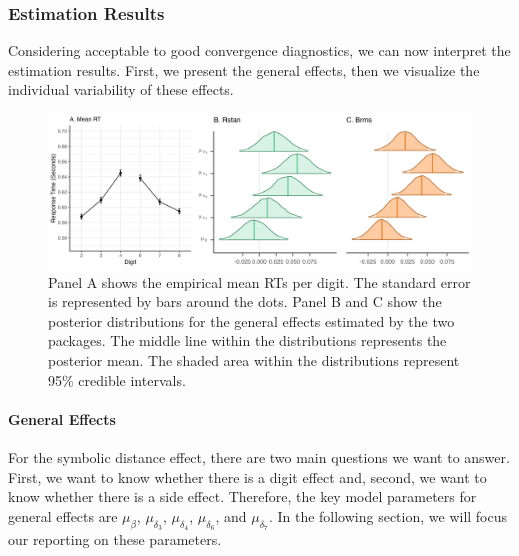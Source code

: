 \documentclass[
  english,
  doc,floatsintext]{apa6}
\let\oldparagraph\paragraph
\renewcommand{\paragraph}[1]{\oldparagraph{#1}\mbox{}}
\begin{document}
\hypertarget{estimation-results}{%
\subsubsection{Estimation Results}\label{estimation-results}}

Considering acceptable to good convergence diagnostics, we can now interpret the estimation results. First, we present the general effects, then we visualize the individual variability of these effects.

\begin{figure}[H]

\includegraphics[width=1\linewidth]{I - Images/Fig10_posteriormu_v3} \hfill{}

\caption{Panel A shows the empirical mean RTs per digit. The standard error is represented by bars around the dots. Panel B and C show the posterior distributions for the general effects estimated by the two packages. The middle line within the distributions represents the posterior mean. The shaded area within the distributions represent 95\% credible intervals.}\label{fig:modelposteriorsmufigure3}
\end{figure}

\hypertarget{general-effects}{%
\paragraph{General Effects}\label{general-effects}}

For the symbolic distance effect, there are two main questions we want to answer. First, we want to know whether there is a digit effect and, second, we want to know whether there is a side effect. Therefore, the key model parameters for general effects are \(\mu_{\beta}\), \(\mu_{\delta_{3}}\), \(\mu_{\delta_4}\), \(\mu_{\delta_6}\), and \(\mu_{\delta_{7}}\). In the following section, we will focus our reporting on these parameters.
\end{document}
